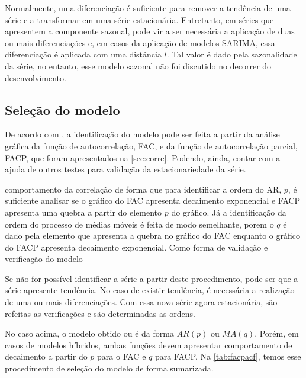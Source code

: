 \documentclass[
    12pt,
    oneside,
    a4paper,
    english,
    brazil
]{abntex2}
\begin{document}
Normalmente, uma diferenciação  é suficiente  para remover  a tendência  de uma
série  e a  transformar em  uma série  estacionária. Entretanto, em séries  que
apresentem a componente  sazonal, pode vir a ser necessária a aplicação de duas
ou  mais  diferenciações e, em  casos  da  aplicação  de modelos  SARIMA,  essa
diferenciação é aplicada com uma distância  $l$. Tal valor é dado pela
sazonalidade da  série, no entanto,  esse modelo  sazonal não foi  discutido no
decorrer do desenvolvimento.

\subsection{Seleção do modelo}

De  acordo com  , a identificação do  modelo pode  ser feita  a
partir da  análise gráfica  da função  de autocorrelação, FAC,  e da  função de
autocorrelação parcial,  FACP, que  foram apresentados  na \autoref{sec:corre}.
Podendo,  ainda,  contar com a ajuda de  outros testes para validação da 
estacionariedade da série.

comportamento da correlação de forma que para identificar a ordem do AR, $p$, é
suficiente analisar se o gráfico do FAC apresenta decaimento exponencial e FACP
apresenta uma quebra a partir do elemento $p$ do gráfico. Já a identificação da
ordem do processo  de médias móveis é  feita de modo semelhante, porem  o $q$ é
dado pela elemento que apresenta a quebra  no gráfico do FAC enquanto o gráfico
do FACP  apresenta decaimento  exponencial. Como forma de validação e
verificação do modelo

Se não for  possível identificar a série a partir  deste procedimento, pode ser
que a  série apresente  tendência. No  caso de  existir tendência, é necessária
a  realização  de  uma  ou  mais diferenciações.  Com  essa  nova  série  agora
estacionária, são refeitas as verificações e são determinadas as ordens.



No caso acima, o modelo obtido ou é da forma $AR(p)$ ou $MA(q)$. Porém, em casos
de modelos híbridos, ambas funções  devem apresentar comportamento de decaimento
a partir do  $p$ para o FAC  e $q$ para FACP\@.  Na \autoref{tab:facpacf}, temos
esse procedimento de seleção do modelo de forma sumarizada.
\end{document}
